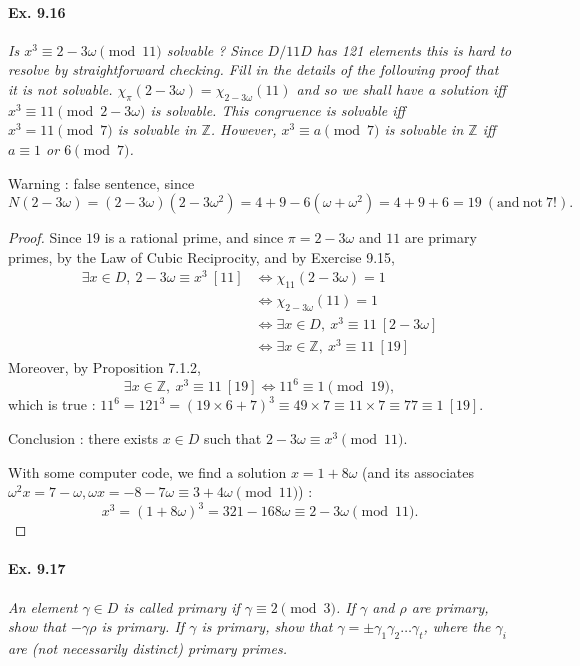 \documentclass[11pt,a4paper]{article}
\newcommand{\Z}{\mathbb{Z}}
\begin{document}
\paragraph{Ex. 9.16}

{\it Is $x^3 \equiv 2 - 3\omega \pmod {11}$ solvable ? Since $D/11D$ has 121 elements this is hard to resolve by straightforward checking. Fill in the details of the following proof that it is not solvable. $\chi_{\pi}(2 - 3 \omega) = \chi_{2-3\omega}(11)$ and so we shall have a solution iff $x^3 \equiv 11 \pmod {2-3\omega}$ is solvable. This congruence is solvable iff $x^3 = 11\pmod 7$ is solvable in $\Z$. However, $x^3 \equiv a \pmod 7$ is solvable in $\Z$ iff $a \equiv 1$ or $6 \pmod 7$.
}

\bigskip
Warning : false sentence, since 
$$N(2 - 3 \omega) = (2-3\omega)(2 - 3 \omega^2) = 4 + 9 -6(\omega+\omega^2) = 4 + 9 + 6 = 19 \ (\mathrm{and}\ \mathrm{not}\ 7!).$$
\begin{proof}
Since $19$ is a rational prime, and since $\pi= 2 - 3\omega$ and $11$  are primary primes, by the Law of Cubic Reciprocity, and by Exercise 9.15,
\begin{align*}
\exists x \in D,\ 2-3\omega \equiv x^3\ [11]&\iff \chi_{11}(2-3\omega) = 1\\
&\iff \chi_{2-3\omega}(11)=1\\
&\iff \exists x \in D,\  x^3 \equiv 11\  [2 - 3 \omega]\\
&\iff \exists x \in \mathbb{Z},\  x^3 \equiv 11\  [19]
\end{align*}
Moreover, by Proposition 7.1.2,
$$\exists x \in \mathbb{Z},\  x^3 \equiv 11\  [19] \iff 11^6 \equiv 1 \pmod {19},$$
which is true : $11^6 = 121^3 = (19 \times 6 + 7)^3 \equiv 49 \times 7 \equiv 11 \times 7 \equiv 77 \equiv 1 \ [19]$.

Conclusion : there exists $x \in D$ such that $2-3\omega  \equiv x^3 \pmod {11}$.

With some computer code, we find a solution $x = 1 + 8\omega$ (and its associates $\omega^2 x =  7 - \omega, \omega x = -8- 7\omega \equiv 3 + 4 \omega \pmod{11} $) :
$$x^3 = (1+8\omega)^3 = 321 - 168 \omega \equiv 2 - 3 \omega \pmod {11}.$$
\end{proof}


\paragraph{Ex. 9.17}

{\it An element $\gamma \in D$ is called primary if $\gamma \equiv2 \pmod 3$. If $\gamma$ and $\rho$ are primary, show that $-\gamma \rho$ is primary. If $\gamma$ is primary, show that $\gamma = \pm \gamma_1\gamma_2\ldots \gamma_t$, where the $\gamma_i$ are (not necessarily distinct) primary primes.
}
\end{document}
